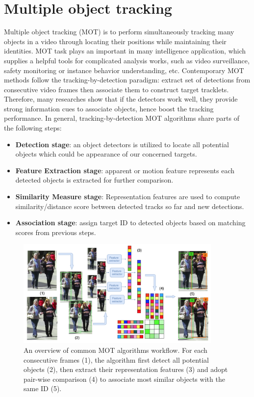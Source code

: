 \section{Multiple object tracking}
\label{sec:mot}
Multiple object tracking (MOT) is to perform simultaneously tracking many objects in a video through locating their positions while maintaining their identities.
MOT task plays an important in many intelligence application, which supplies a helpful tools for complicated analysis works, such as video surveillance, safety monitoring or instance behavior understanding, etc.
Contemporary MOT methods follow the tracking-by-detection paradigm: extract set of detections from consecutive video frames then associate them to construct target tracklets. Therefore, many researches \cite{bergmann2019tracking,zhou2020tracking,bochinski2017high,bewley2016simple} show that if the detectors work well, they provide strong information cues to associate objects, hence boost the tracking performance. 
In general, tracking-by-detection MOT algorithms share parts of the following steps:
\begin{itemize}
    \item \textbf{Detection stage}: an object detectors is utilized to locate all potential objects which could be appearance of our concerned targets.
    \item \textbf{Feature Extraction stage}: apparent or motion feature represents each detected objects is extracted for further comparison.
    \item \textbf{Similarity Measure stage}: Representation features are used to compute similarity/distance score between detected tracks so far and new detections.
    \item \textbf{Association stage}: assign target ID to detected objects based on matching scores from previous steps.
\end{itemize}
\begin{figure}[t!]
    \centering
    \includegraphics[width=0.9\textwidth]{images/MOT_overview.png}
    \caption{An overview of common MOT algorithms workflow. For each consecutive frames (1), the algorithm first detect all potential objects (2), then extract their representation features (3) and adopt pair-wise comparison (4) to associate most similar objects with the same ID (5). \cite{ciaparrone2020deep}}
    \label{fig:MOT_overview}
\end{figure}

